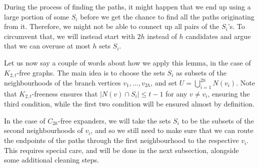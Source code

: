 \documentclass[10pt, a4paper]{article}
\numberwithin{theorem}{section} %
\theoremstyle{remark}
\theoremstyle{definition}
\begin{document}
During the process of finding the paths, it might happen that we end up using a large portion of some $S_i$ before we get the chance to find all the paths originating from it. Therefore, we might not be able to connect up all pairs of the $S_i$'s. To circumvent that, we will instead start with $2h$ instead of $h$ candidates and argue that we can overuse at most $h$ sets $S_i$.

Let us now say a couple of words about how we apply this lemma, in the case of $K_{2, t}$-free graphs. The main idea is to choose the sets $S_i$ as subsets of the neighbourhoods of the branch vertices $v_1, \dots, v_{2h}$, and set $U=\bigcup_{i=1}^{2h}N(v_i)$. Note that $K_{2, t}$-freeness ensures that $|N(v)\cap S_i|\leq t-1$ for any $v\neq v_i$, ensuring the third condition, while the first two condition will be ensured almost by definition.

In the case of $C_{2k}$-free expanders, we will take the sets $S_i$ to be the subsets of the second neighbourhoods of $v_i$, and so we still need to make sure that we can route the endpoints of the paths through the first neighbourhood to the respective $v_i$. This requires special care, and will be done in the next subsection, alongside some additional cleaning steps. %
\end{document}
